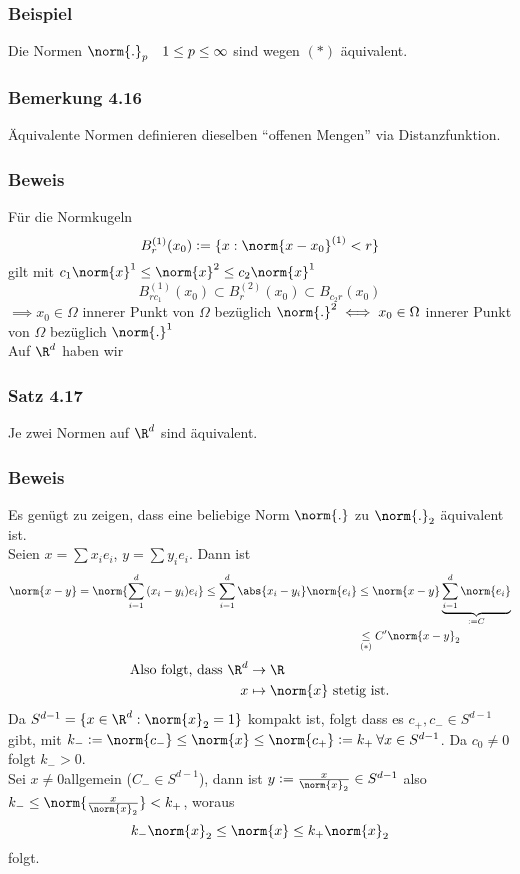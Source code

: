 \subsubsection*{Beispiel}
Die Normen $\norm{.}_{p} \quad 1\leq p\leq\infty$ sind wegen $(\ast)$ äquivalent.
\subsubsection*{Bemerkung 4.16}
Äquivalente Normen definieren dieselben ``offenen Mengen'' via Distanzfunktion.
\subsubsection*{Beweis}
Für die Normkugeln \[ B_{r}^{(1)}(x_{0})\defeq \{ x:\norm{x-x_{0}}^{(1)}<r\} \] gilt mit $c_{1}\norm{x}^{1}\leq\norm{x}^{2}\leq c_{2}\norm{x}^{1}$ \[ B_{rc_{1}}^{(1)}(x_{0}) \subset B_{r}^{(2)}(x_{0}) \subset B_{c_{2}r}(x_{0})\]
$\implies x_{0} \in \Omega$ innerer Punkt von $\Omega$ bezüglich $\norm{.}^{2} \iff x_{0}\in\Omega$ innerer Punkt von $\Omega$ bezüglich $\norm{.}^{1}$ \\

\noindent Auf $\R^{d}$ haben wir
\subsubsection*{Satz 4.17}
Je zwei Normen auf $\R^{d}$ sind äquivalent.
\subsubsection*{Beweis}
Es genügt zu zeigen, dass eine beliebige Norm $\norm{.}$ zu $\norm{.}_{2}$ äquivalent ist. \\
Seien $x=\sum{x_{i}e_{i}}$, $y=\sum{y_{i}e_{i}}$.
Dann ist
\begin{align*} \norm{x-y} = \norm{\sum_{i=1}^{d}{(x_{i}-y_{i})e_{i}}} \leq \sum_{i=1}^{d}{\abs{x_{i}-y_{i}}\norm{e_{i}}} &\leq \norm{x-y}\underbrace{\sum^{d}_{i=1}{\norm{e_{i}}}}_{\defeq C} \\
 &\underset{(\ast)}{\leq} C' \norm{x-y}_{2}\end{align*}
\begin{align*}\text{Also folgt, dass } \R^{d}&\to \R \\ x &\mapsto \norm{x}\text{ stetig ist.}\end{align*}
Da $S^{d-1} = \{ x\in\R^{d}:\norm{x}_{2}=1\}$ kompakt ist, folgt dass es $c_{+}, c_{-}\in S^{d-1}$ gibt, mit ${k_{-}\defeq\norm{c_{-}}}\leq\norm{x}\leq{\norm{c_{+}}\defeq k_{+}} \: \forall x\in S^{d-1}$. Da $c_{0}\neq 0$ folgt $k_{-}>0$. \\
Sei $x\neq0$allgemein ($C_{-}\in S^{d-1}$), dann ist $y\defeq\frac{x}{\norm{x}_{2}}\in S^{d-1}$ also $k_{-}\leq \norm{\frac{x}{\norm{x}_{2}}}<k_{+}$, woraus \[ k_{-}\norm{x}_{2}\leq\norm{x}\leq k_{+}\norm{x}_{2}\] folgt.

